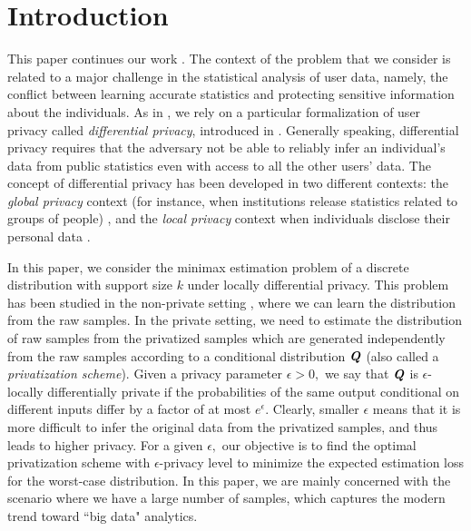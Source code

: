 \documentclass[11pt,onecolumn]{IEEEtran}
\def\mathbi#1{{\textbf{\textit #1}}}
\begin{document}
\section{Introduction} This paper continues our work \cite{Ye17}. The context of the problem that we consider is
related to a major challenge in the statistical analysis of user data, namely, the conflict between learning accurate 
statistics and protecting sensitive information about the individuals. 
As in \cite{Ye17}, we rely on a particular formalization of user privacy called {\em differential privacy}, introduced in \cite{Dwork06, Dwork08}.
Generally speaking, differential privacy requires that the adversary not be able to reliably infer an individual's data from public statistics even with access to all the other users' data.
The concept of differential privacy has been developed in two different contexts: the {\em global privacy}
context (for instance, when institutions release statistics related to groups of people) \cite{Ghosh12}, and the {\em local privacy} context when individuals disclose their personal data \cite{Duchi13}.

In this paper, we consider the minimax estimation problem of a discrete distribution with support size $k$ under locally differential privacy.
This problem has been studied in the non-private setting \cite{Kamath15, Lehmann06}, where we can learn the distribution from the raw samples.
In the private setting, we need to estimate the distribution of raw samples from the privatized samples which are generated independently from the raw samples according to a conditional distribution  $\mathbi{Q}$ (also called a {\em privatization scheme}).
Given a privacy parameter $\epsilon>0,$
we say that $\mathbi{Q}$ is $\epsilon$-locally differentially private if the probabilities of the same output conditional on different inputs differ by a factor of at most $e^{\epsilon}.$ Clearly, smaller $\epsilon$ means that it is more difficult to infer the original data from the privatized samples, and thus leads to higher privacy.
For a given $\epsilon,$ our objective is to find the optimal privatization scheme with $\epsilon$-privacy level to minimize the expected estimation loss for the worst-case distribution.
In this paper, we are mainly
concerned with the scenario where we have a large number of
samples, which captures the modern trend toward ``big data" analytics.
\end{document}
